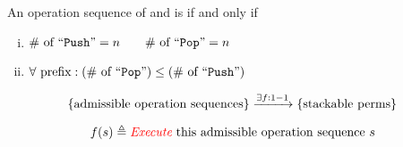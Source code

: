 \begin{frame}{}
  \begin{definition}
    An operation sequence of  and  is  if and only if
    \begin{enumerate}[(i)]
      \pause
      \item $\# \text{ of ``\texttt{Push}''} = n \qquad \# \text{ of ``\texttt{Pop}''} = n$
      \pause
      \item $\forall \text{ prefix}: (\# \text{ of ``\texttt{Pop}''}) \le (\# \text{ of ``\texttt{Push}''})$
    \end{enumerate}
  \end{definition}

  \vspace{0.50cm}
  \pause
  \begin{center}
  \end{center}

  \pause
  \[
    \{\text{admissible operation sequences}\} \xrightarrow{\exists f: 1-1} \{\text{stackable perms}\}
  \]

  \pause
  \[
    f(s) \triangleq \text{\textcolor{red}{\it Execute} this admissible operation sequence } s
  \]

  \pause
  \begin{center}
  \end{center}
\end{frame}

% 

